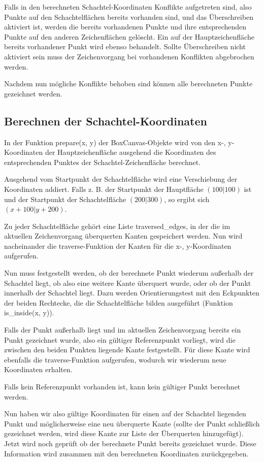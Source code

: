Falls in den berechneten Schachtel-Koordinaten Konflikte aufgetreten
sind, also Punkte auf den Schachtelflächen bereits vorhanden sind,
und das Überschreiben aktiviert ist, werden die bereits vorhandenen
Punkte und ihre entsprechenden Punkte auf den anderen Zeichenflächen
gelöscht. Ein auf der Hauptzeichenfläche bereits vorhandener Punkt
wird ebenso behandelt. Sollte Überschreiben nicht aktiviert sein muss
der Zeichenvorgang bei vorhandenen Konflikten abgebrochen werden.

Nachdem nun mögliche Konflikte behoben sind können alle berechneten
Punkte gezeichnet werden.


\subsection{Berechnen der Schachtel-Koordinaten}

In der Funktion prepare(x, y) der BoxCanvas-Objekte wird von den x-,
y-Koordinaten der Hauptzeichenfläche ausgehend die Koordinaten des
entsprechenden Punktes der Schachtel-Zeichenfläche berechnet.

Ausgehend vom Startpunkt der Schachtelfläche wird eine Verschiebung
der Koordinaten addiert. Falls z. B. der Startpunkt der Hauptfläche
$(100|100)$ ist und der Startpunkt der Schachtelfläche $(200|300)$,
so ergibt sich $(x+100|y+200)$.

Zu jeder Schachtelfläche gehört eine Liste traversed\_edges, in der
die im aktuellen Zeichenvorgang überquerten Kanten gespeichert werden.
Nun wird nacheinander die traverse-Funktion der Kanten für die x-,
y-Koordinaten aufgerufen.

Nun muss festgestellt werden, ob der berechnete Punkt wiederum außerhalb
der Schachtel liegt, ob also eine weitere Kante überquert wurde, oder
ob der Punkt innerhalb der Schachtel liegt. Dazu werden Orientierungstest
mit den Eckpunkten der beiden Rechtecke, die die Schachtelfläche bilden
ausgeführt (Funktion is\_inside(x, y)).

Falls der Punkt außerhalb liegt und im aktuellen Zeichenvorgang bereits
ein Punkt gezeichnet wurde, also ein gültiger Referenzpunkt vorliegt,
wird die zwischen den beiden Punkten liegende Kante festgestellt.
Für diese Kante wird ebenfalls die traverse-Funktion aufgerufen, wodurch
wir wiederum neue Koordinaten erhalten.

Falls kein Referenzpunkt vorhanden ist, kann kein gültiger Punkt berechnet
werden.

Nun haben wir also gültige Koordinaten für einen auf der Schachtel
liegenden Punkt und möglicherweise eine neu überquerte Kante (sollte
der Punkt schließlich gezeichnet werden, wird diese Kante zur Liste
der Überquerten hinzugefügt). Jetzt wird noch geprüft ob der berechnete
Punkt bereits gezeichnet wurde. Diese Information wird zusammen mit
den berechneten Koordinaten zurückgegeben.


